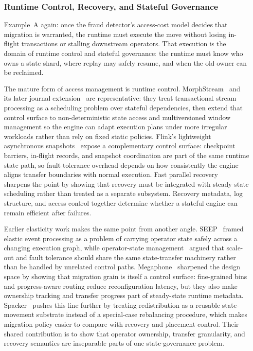 \documentclass[acmsmall,screen,review]{acmart}
\begin{document}
\subsubsection{Runtime Control, Recovery, and Stateful Governance}

Example~A again: once the fraud detector's access-cost model decides that migration is warranted, the runtime must execute the move without losing in-flight transactions or stalling downstream operators. That execution is the domain of runtime control and stateful governance: the runtime must know who owns a state shard, where replay may safely resume, and when the old owner can be reclaimed.

The mature form of access management is runtime control. MorphStream~\cite{mao2023morphstream} and its later journal extension~\cite{zhao2025morphstream} are representative: they treat transactional stream processing as a scheduling problem over stateful dependencies, then extend that control surface to non-deterministic state access and multiversioned window management so the engine can adapt execution plans under more irregular workloads rather than rely on fixed static policies. Flink's lightweight asynchronous snapshots~\cite{carbone2015asynchronous} expose a complementary control surface: checkpoint barriers, in-flight records, and snapshot coordination are part of the same runtime state path, so fault-tolerance overhead depends on how consistently the engine aligns transfer boundaries with normal execution. Fast parallel recovery~\cite{zhao2024recovery} sharpens the point by showing that recovery must be integrated with steady-state scheduling rather than treated as a separate subsystem. Recovery metadata, log structure, and access control together determine whether a stateful engine can remain efficient after failures.

Earlier elasticity work makes the same point from another angle. SEEP~\cite{fernandez2010seep} framed elastic event processing as a problem of carrying operator state safely across a changing execution graph, while operator-state management~\cite{fernandez2013osm} argued that scale-out and fault tolerance should share the same state-transfer machinery rather than be handled by unrelated control paths. Megaphone~\cite{nasir2019megaphone} sharpened the design space by showing that migration grain is itself a control surface: fine-grained bins and progress-aware routing reduce reconfiguration latency, but they also make ownership tracking and transfer progress part of steady-state runtime metadata. Spacker~\cite{mao2025spacker} pushes this line further by treating redistribution as a reusable state-movement substrate instead of a special-case rebalancing procedure, which makes migration policy easier to compare with recovery and placement control. Their shared contribution is to show that operator ownership, transfer granularity, and recovery semantics are inseparable parts of one state-governance problem.
\end{document}
